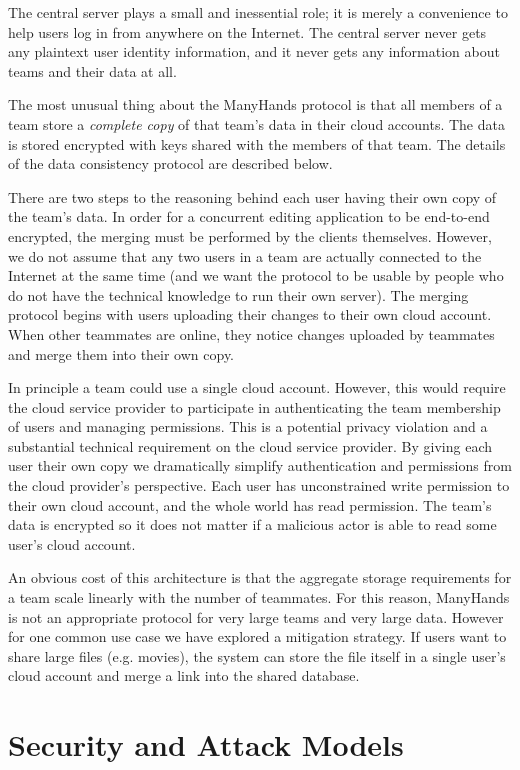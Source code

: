 \documentclass[pldi,10pt,preprint]{sigplanconf-pldi16}
\begin{document}
The central server plays a small and inessential role; it is merely a convenience to help users log in from anywhere on the Internet.
The central server never gets any plaintext user identity information, and it never gets any information about teams and their data at all.

The most unusual thing about the ManyHands protocol is that all members of a team store a \emph{complete copy} of that team's data in their cloud accounts.
The data is stored encrypted with keys shared with the members of that team.
The details of the data consistency protocol are described below.

There are two steps to the reasoning behind each user having their own copy of the team's data.
In order for a concurrent editing application to be end-to-end encrypted, the merging must be performed by the clients themselves.
However, we do not assume that any two users in a team are actually connected to the Internet at the same time (and we want the protocol to be usable by people who do not have the technical knowledge to run their own server).
The merging protocol begins with users uploading their changes to their own cloud account.
When other teammates are online, they notice changes uploaded by teammates and merge them into their own copy.

In principle a team could use a single cloud account.
However, this would require the cloud service provider to participate in authenticating the team membership of users and managing permissions.
This is a potential privacy violation and a substantial technical requirement on the cloud service provider.
By giving each user their own copy we dramatically simplify authentication and permissions from the cloud provider's perspective.
Each user has unconstrained write permission to their own cloud account, and the whole world has read permission.
The team's data is encrypted so it does not matter if a malicious actor is able to read some user's cloud account.

An obvious cost of this architecture is that the aggregate storage requirements for a team scale linearly with the number of teammates.
For this reason, ManyHands is not an appropriate protocol for very large teams and very large data.
However for one common use case we have explored a mitigation strategy.
If users want to share large files (e.g. movies), the system can store the file itself in a single user's cloud account and merge a link into the shared database.

\section{Security and Attack Models}
\end{document}

